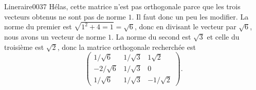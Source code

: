 \begin{corrige}{Lineraire0037}
	Hélas, cette matrice n'est pas orthogonale parce que les trois vecteurs obtenus ne sont pas de norme $1$. Il faut donc un peu les modifier. La norme du premier est $\sqrt{1^2+4=1}=\sqrt{6}$, donc en divisant le vecteur par $\sqrt{6}$, nous avons un vecteur de norme $1$. La norme du second est $\sqrt{3}$ et celle du troisième est $\sqrt{2}$, donc la matrice orthogonale recherchée est
	\begin{equation}
		\begin{pmatrix}
			1/\sqrt{6}	&	1/\sqrt{3}	&	1\sqrt{2}	\\
			-2/\sqrt{6}	&	1/\sqrt{3}	&	0	\\
			1/\sqrt{6}	&	1/\sqrt{3}	&	-1/\sqrt{2}
		\end{pmatrix}.
	\end{equation}
\end{corrige}
